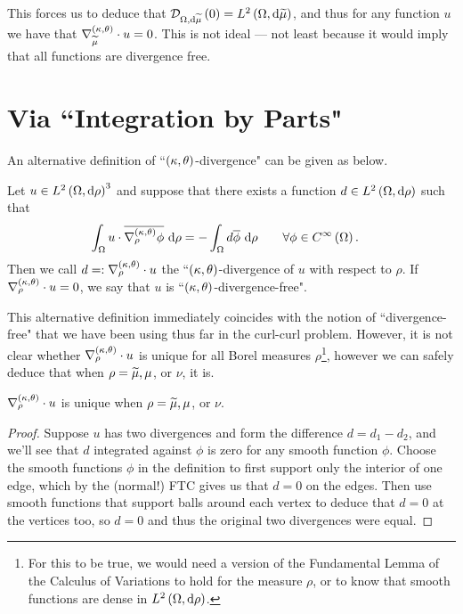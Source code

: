 \documentclass[11pt]{report}
\newcommand{\ktdiv}[1]{\ktgrad_{#1}\cdot}
\newcommand{\divZero}[2]{\mathcal{D}_{#1, \md #2}\bracs{0}}
\begin{document}
This forces us to deduce that $\divZero{\ddom}{\dddmes} = \ltwo{\ddom}{\dddmes}$, and thus for any function $u$ we have that $\ktdiv{\dddmes}u = 0$.
This is not ideal --- not least because it would imply that all functions are divergence free.

\section{Via ``Integration by Parts"}
An alternative definition of ``$\left( \kappa, \theta \right)$-divergence" can be given as below.
\begin{definition}
	Let $u\in L^{2}\left( \Omega,\mathrm{d}\rho \right)^3$ and suppose that there exists a function $d\in L^{2}\left( \Omega,\mathrm{d}\rho \right)$ such that
	\begin{align*}
		\int_{\Omega} u\cdot\overline{\nabla^{\left( \kappa, \theta \right)}_{\rho}\phi}  \ \mathrm{d}\rho
		&= -\int_{\Omega} d\overline{\phi}  \ \mathrm{d}\rho
		\qquad \forall\phi\in C^{\infty}\left( \Omega \right).
	\end{align*}
	Then we call $d =: \ktdiv{\rho}u$ the ``$\left( \kappa, \theta \right)$-divergence of $u$ with respect to $\rho$.
	If $\ktdiv{\rho}u=0$, we say that $u$ is ``$\left( \kappa, \theta \right)$-divergence-free".
\end{definition}

This alternative definition immediately coincides with the notion of ``divergence-free" that we have been using thus far in the curl-curl problem.
However, it is not clear whether $\ktdiv{\rho}u$ is unique for all Borel measures $\rho$\footnote{For this to be true, we would need a version of the Fundamental Lemma of the Calculus of Variations to hold for the measure $\rho$, or to know that smooth functions are dense in $L^{2}\left( \Omega,\mathrm{d}\rho \right)$.}, however we can safely deduce that when $\rho=\widetilde{\mu}, \mu$, or $\nu$, it is.
\begin{lemma}
	$\ktdiv{\rho}u$ is unique when $\rho=\widetilde{\mu}, \mu$, or $\nu$.
\end{lemma}
\begin{proof}
	Suppose $u$ has two divergences and form the difference $d=d_1-d_2$, and we'll see that $d$ integrated against $\phi$ is zero for any smooth function $\phi$.
	Choose the smooth functions $\phi$ in the definition to first support only the interior of one edge, which by the (normal!) FTC gives us that $d=0$ on the edges.
	Then use smooth functions that support balls around each vertex to deduce that $d=0$ at the vertices too, so $d=0$ and thus the original two divergences were equal.
\end{proof}
\end{document}
